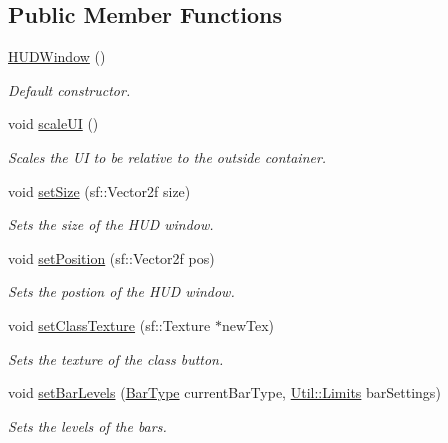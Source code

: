 \subsection*{Public Member Functions}
\begin{DoxyCompactItemize}
\item 
\hyperlink{class_h_u_d_window_a0a3a8f276b89dfacaf2a65484a3b11c8}{H\+U\+D\+Window} ()
\begin{DoxyCompactList}\small\item\em Default constructor. \end{DoxyCompactList}\item 
void \hyperlink{class_h_u_d_window_af521ea9fc7357f71c0e1dbc9c23d64f7}{scale\+UI} ()
\begin{DoxyCompactList}\small\item\em Scales the UI to be relative to the outside container. \end{DoxyCompactList}\item 
void \hyperlink{class_h_u_d_window_a764ef0d5ea029cdf09b62af0f59ef74f}{set\+Size} (sf\+::\+Vector2f size)
\begin{DoxyCompactList}\small\item\em Sets the size of the H\+UD window. \end{DoxyCompactList}\item 
void \hyperlink{class_h_u_d_window_a3b77bee82174e05560ccb90d3b55135f}{set\+Position} (sf\+::\+Vector2f pos)
\begin{DoxyCompactList}\small\item\em Sets the postion of the H\+UD window. \end{DoxyCompactList}\item 
void \hyperlink{class_h_u_d_window_a07c5e4b149710405c278d9465bf7b8e2}{set\+Class\+Texture} (sf\+::\+Texture $\ast$new\+Tex)
\begin{DoxyCompactList}\small\item\em Sets the texture of the class button. \end{DoxyCompactList}\item 
void \hyperlink{class_h_u_d_window_a579e607782772cb41a7baf6160c14f40}{set\+Bar\+Levels} (\hyperlink{_h_u_d_window_8h_a3bf4c8f0af36af02aca4222b3672bc1d}{Bar\+Type} current\+Bar\+Type, \hyperlink{struct_util_1_1_limits}{Util\+::\+Limits} bar\+Settings)
\begin{DoxyCompactList}\small\item\em Sets the levels of the bars. \end{DoxyCompactList}\item 

\end{DoxyCompactItemize}
